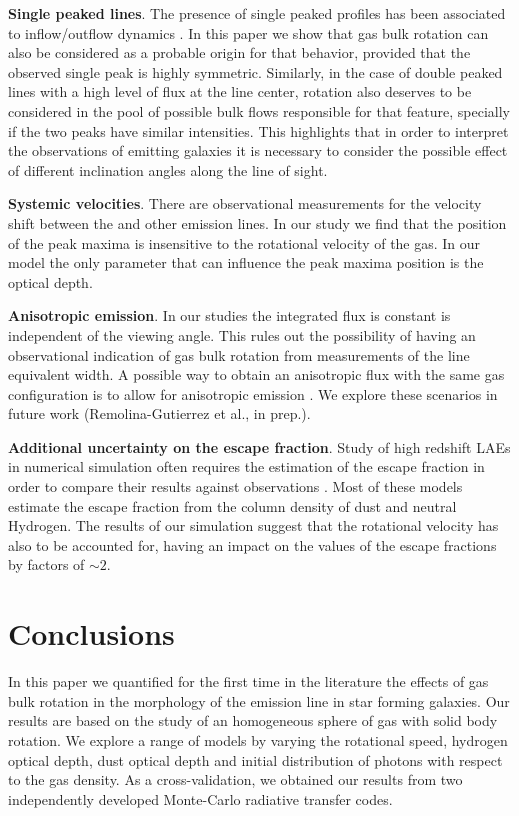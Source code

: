 \documentclass{emulateapj}
\newcommand{\ly}{{\ifmmode{{\rm Ly}\alpha~}\else{Ly$\alpha$~}\fi}}
\begin{document}
{\bf Single peaked lines}. The presence of single peaked profiles has
been associated to inflow/outflow dynamics
\citep{Verhamme06,DijkstraKramer}. In this paper we show that gas bulk
rotation can also be considered as a probable origin for that
behavior, provided that the observed single peak is highly
symmetric. Similarly, in the case of double peaked lines with a high
level of flux at the line center, rotation also deserves to be
considered in the pool of possible bulk flows responsible for that feature,
specially if the two peaks have similar intensities. This highlights
that in order to interpret the observations of \ly emitting galaxies
it is necessary to consider the possible effect of different
inclination angles along the line of sight.

{\bf Systemic velocities}. There are observational measurements for the
velocity shift between the \ly and other emission lines. In our study
we find that the position of the peak maxima is insensitive to the
rotational velocity of the gas. In our model the only parameter that
can influence the peak maxima position is the optical depth.

{\bf Anisotropic emission}. In our studies the integrated flux is
constant is independent of the viewing angle. This rules out the
possibility of having an observational indication of gas bulk rotation
from measurements of the line equivalent width. A possible way to
obtain an anisotropic flux with the same gas configuration is to allow
for anisotropic emission \citep{Zheng2013,Behrens2014}. We explore
these scenarios in future work (Remolina-Gutierrez et al., in prep.).

{\bf Additional uncertainty on the \ly escape fraction}. Study of
high redshift LAEs in numerical simulation often requires the
estimation of the \ly escape fraction in order to compare their
results against observations
\citep{CLARA,Dayal2012,Forero12,Orsi12,Garel2012}. Most of these
models estimate the escape fraction from the column density of dust and
neutral Hydrogen. The results of our simulation suggest that the
rotational velocity has also to be accounted for, having an impact on
the values of the escape fractions by factors of $\sim 2$. 


\section{Conclusions}
\label{sec:conclusions}

In this paper we quantified for the first time in the literature the effects
of gas bulk rotation in the morphology of the \ly emission line in star forming
galaxies.  Our results are based on the study of an homogeneous sphere
of gas with solid body rotation. We explore a range of models by varying
the rotational speed, hydrogen optical depth, dust optical depth and
initial distribution of \ly photons with respect to the gas
density. As a cross-validation, we obtained our results from two
independently developed Monte-Carlo radiative transfer codes. 
\end{document}

